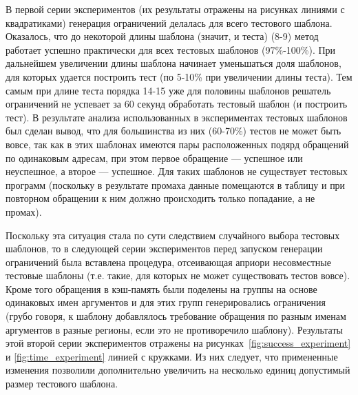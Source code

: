 В первой серии экспериментов (их результаты отражены на рисунках линиями с
квадратиками) генерация ограничений делалась для всего тестового шаблона.
Оказалось, что до некоторой длины шаблона (значит, и теста) (8-9) метод работает
успешно практически для всех тестовых шаблонов (97\%-100\%). При дальнейшем
увеличении длины шаблона начинает уменьшаться доля шаблонов, для которых удается
построить тест (по 5-10\% при увеличении длины теста). Тем самым при длине теста
порядка 14-15 уже для половины шаблонов решатель ограничений не успевает за 60
секунд обработать тестовый шаблон (и построить тест). В результате анализа использованных в
экспериментах тестовых шаблонов был сделан вывод, что для большинства из них
(60-70\%) тестов не может быть вовсе, так как в этих шаблонах имеются пары расположенных подярд обращений
по одинаковым адресам, при этом первое обращение --- успешное или неуспешное, а второе --- успешное. Для таких шаблонов не существует тестовых программ (поскольку в результате промаха данные помещаются в таблицу и при повторном обращении к ним должно происходить только попадание, а не промах).

Поскольку эта ситуация стала по сути следствием случайного выбора тестовых
шаблонов, то в следующей серии экспериментов перед запуском генерации
ограничений была вставлена процедура, отсеивающая априори несовместные тестовые
шаблоны (т.е. такие, для которых не может существовать тестов вовсе). Кроме того
обращения в кэш-память были поделены на группы на основе одинаковых имен
аргументов и для этих групп генерировались ограничения (грубо говоря, к шаблону
добавлялось требование обращения по разным именам аргументов в разные регионы,
если это не противоречило шаблону). Результаты этой второй серии экспериментов
отражены на рисунках~\ref{fig:success_experiment} и \ref{fig:time_experiment}
линией с кружками. Из них следует, что примененные изменения позволили
дополнительно увеличить на несколько единиц допустимый размер тестового шаблона.

